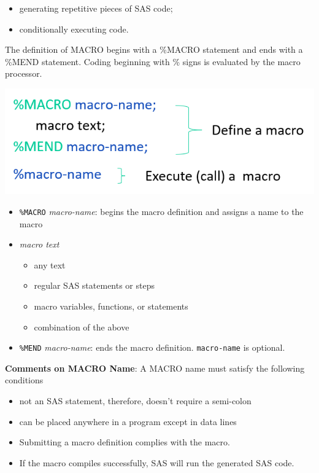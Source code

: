 \documentclass[
]{book}
\providecommand{\tightlist}{%
  \setlength{\itemsep}{0pt}\setlength{\parskip}{0pt}}
\begin{document}
\begin{itemize}
\tightlist
\item
  generating repetitive pieces of SAS code;
\item
  conditionally executing code.
\end{itemize}

The definition of MACRO begins with a \%MACRO statement and ends with a \%MEND statement. Coding beginning with \% signs is evaluated by the macro processor.

\begin{center}\includegraphics[width=0.6\linewidth]{img14/w14-MACRO-DefinitionCalling} \end{center}

\begin{itemize}
\item
  \texttt{\%MACRO} \emph{macro-name}: begins the macro definition and assigns a name to the macro
\item
  \emph{macro text}

  \begin{itemize}
  \tightlist
  \item
    any text
  \item
    regular SAS statements or steps
  \item
    macro variables, functions, or statements
  \item
    combination of the above
  \end{itemize}
\item
  \texttt{\%MEND} \emph{macro-name}: ends the macro definition. \texttt{macro-name} is optional.
\end{itemize}

\textbf{Comments on MACRO Name}: A MACRO name must satisfy the following conditions

\begin{itemize}
\tightlist
\item
  not an SAS statement, therefore, doesn't require a semi-colon
\item
  can be placed anywhere in a program except in data lines
\item
  Submitting a macro definition complies with the macro.
\item
  If the macro compiles successfully, SAS will run the generated SAS code.
\end{itemize}
\end{document}
